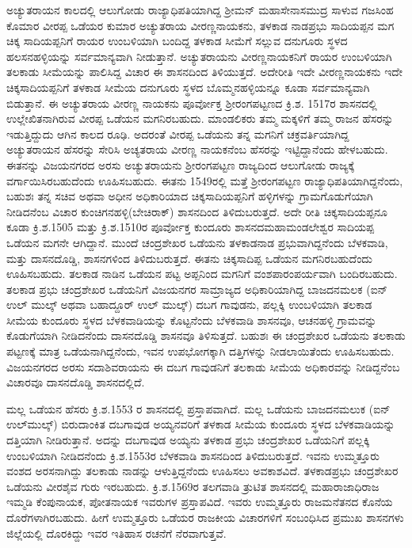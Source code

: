 ಅಚ್ಯುತರಾಯನ ಕಾಲದಲ್ಲಿ ಆಲುಗೋಡು ರಾಜ್ಯಾಧಿಪತಿಯಾಗಿದ್ದ ಶ‍್ರೀಮನ್​ ಮಹಾಸೇನಾಸಮುದ್ರ ಸಾಳುವ ಗಜಸಿಂಹ ಕೊಮಾರ ವೀರಪ್ಪ ಒಡೆಯರ ಕುಮಾರ ಅಚ್ಯುತರಾಯ ವೀರಣ್ಣನಾಯಕನು, ತಳಕಾಡ ನಾಡಪ್ರಭು ಸಾದಿಯಪ್ಪನ ಮಗ ಚಿಕ್ಕ ಸಾದಿಯಪ್ಪನಿಗೆ ರಾಯರ ಉಂಬಳಿಯಾಗಿ ಬಂದಿದ್ದ ತಳಕಾಡ ಸೀಮೆಗೆ ಸಲ್ಲುವ ದನುಗೂರು ಸ್ಥಳದ ಹಲಸನಹಳ್ಳಿಯನ್ನು ಸರ್ವಮಾನ್ಯವಾಗಿ ನೀಡುತ್ತಾನೆ. ಅಚ್ಯುತರಾಯನು ವೀರಣ್ಣನಾಯಕನಿಗೆ ರಾಯರ ಉಂಬಳಿಯಾಗಿ ತಲಕಾಡು ಸೀಮೆಯನ್ನು ಪಾಲಿಸಿದ್ದ ವಿಚಾರ ಈ ಶಾಸನದಿಂದ ತಿಳಿಯುತ್ತದೆ. ಅದೇರೀತಿ ಇದೇ ವೀರಣ್ಣನಾಯಕನು ಇದೇ ಚಿಕ್ಕಸಾದಿಯಪ್ಪನಿಗೆ ತಳಕಾಡ ಸೀಮೆಯ ದನುಗೂರು ಸ್ಥಳದ ಬೊಮ್ಮನಹಳ್ಳಿಯನ್ನೂ ಕೂಡಾ ಸರ್ವಮಾನ್ಯವಾಗಿ ಬಿಡುತ್ತಾನೆ. ಈ ಅಚ್ಯುತರಾಯ ವೀರಣ್ಣ ನಾಯಕನು ಪೂರ್ವೋಕ್ತ ಶ‍್ರೀರಂಗಪಟ್ಟಣದ ಕ್ರಿ.ಶ. 1517ರ ಶಾಸನದಲ್ಲಿ ಉಲ್ಲೇಖಿತನಾಗಿರುವ ವೀರಪ್ಪ ಒಡೆಯನ ಮಗನಿರಬಹುದು. ಮಾಂಡಲಿಕರು ತಮ್ಮ ಮಕ್ಕಳಿಗೆ ತಮ್ಮ ರಾಜನ ಹೆಸರನ್ನು ಇಡುತ್ತಿದ್ದುದು ಆಗಿನ ಕಾಲದ ರೂಢಿ. ಅದರಂತೆ ವೀರಪ್ಪ ಒಡೆಯನು ತನ್ನ ಮಗನಿಗೆ ಚಕ್ರವರ್ತಿಯಾಗಿದ್ದ ಅಚ್ಯುತರಾಯನ ಹೆಸರನ್ನು ಸೇರಿಸಿ ಅಚ್ಯತರಾಯ ವೀರಣ್ಣ ನಾಯಕನೆಂಬ ಹೆಸರನ್ನು ಇಟ್ಟಿದ್ದಾನೆಂದು ಹೇಳಬಹುದು. ಈತನನ್ನು ವಿಜಯನಗರದ ಅರಸು ಅಚ್ಯುತರಾಯನು ಶ‍್ರೀರಂಗಪಟ್ಟಣ ರಾಜ್ಯದಿಂದ ಆಲುಗೋಡು ರಾಜ್ಯಕ್ಕೆ ವರ್ಗಾಯಿಸಿರಬಹುದೆಂದು ಊಹಿಸಬಹುದು. ಈತನು 1549ರಲ್ಲಿ ಮತ್ತೆ ಶ‍್ರೀರಂಗಪಟ್ಟಣ ರಾಜ್ಯಾಧಿಪತಿಯಾಗಿದ್ದನೆಂದು, ಬಹುಶಃ ತನ್ನ ಸಚಿವ ಅಥವಾ ಅಧೀನ ಅಧಿಕಾರಿಯಾದ ಚಿಕ್ಕಸಾದಿಯಪ್ಪ\-ನಿಗೆ ಹಳ್ಳಿಗಳನ್ನು ಗ್ರಾಮಗೊಡುಗೆಯಾಗಿ ನೀಡಿದನೆಂಬ ವಿಚಾರ ಕುಂಚಿಗನಹಳ್ಳಿ(ಬೇಚಿರಾಕ್​) ಶಾಸನದಿಂದ ತಿಳಿದುಬರುತ್ತದೆ. ಅದೇ ರೀತಿ ಚಿಕ್ಕಸಾದಿಯಪ್ಪನೂ ಕೂಡಾ ಕ್ರಿ.ಶ.1505 ಮತ್ತು ಕ್ರಿ.ಶ.1510ರ ಪೂರ್ವೋಕ್ತ ಕುಂದೂರು ಶಾಸನದ\break ಮಹಾಮಂಡಲೇಶ್ವರ ಸಾದಿಯಪ್ಪ ಒಡೆಯನ ಮಗನೇ ಆಗಿದ್ದಾನೆ. ಮುಂದೆ ಚಂದ್ರಶೇಖರ ಒಡೆಯನು ತಳಕಾಡನಾಡ ಪ್ರಭುವಾಗಿದ್ದನೆಂದು ಬೆಳಕವಾಡಿ, ಮತ್ತು ದಾಸನದೊಡ್ಡಿ, ಶಾಸನಗಳಿಂದ ತಿಳಿದುಬರುತ್ತದೆ. ಈತನು ಚಿಕ್ಕಸಾದಿಪ್ಪ ಒಡೆಯನ ಮಗನಿರಬಹುದೆಂದು ಊಹಿಸಬಹುದು. ತಲಕಾಡ ನಾಡಿನ ಒಡೆಯನ ಪಟ್ಟ ಅಪ್ಪನಿಂದ ಮಗನಿಗೆ ವಂಶ\-ಪಾರಂಪರ್ಯವಾಗಿ ಬಂದಿರಬಹುದು. ತಲಕಾಡ ಪ್ರಭು ಚಂದ್ರಶೇಖರ ಒಡೆಯನಿಗೆ ವಿಜಯನಗರ ಸಾಮ್ರಾಜ್ಯದ ಅಧಿಕಾರಿಯಾಗಿದ್ದ ಬಾಜದನಮಲಕ (ಐನ್​ ಉಲ್​ ಮುಲ್ಕ್​ ಅಥವಾ ಬಹಾದ್ದೂರ್ ಉಲ್​ ಮುಲ್ಕ್​) ದಬಗ ಗಾವುಡನು, ಪಲ್ಲಕ್ಕಿ ಉಂಬಳಿಯಾಗಿ ತಲಕಾಡ ಸೀಮೆಯ ಕುಂದೂರು ಸ್ಥಳದ ಬೆಳಕವಾಡಿಯನ್ನು ಕೊಟ್ಟನೆಂದು ಬೆಳಕವಾಡಿ ಶಾಸನವೂ, ಆಚನಹಳ್ಳಿ ಗ್ರಾಮವನ್ನು ಕೊಡುಗೆಯಾಗಿ ನೀಡಿದನೆಂದು ದಾಸನದೊಡ್ಡಿ ಶಾಸನವೂ ತಿಳಿಸುತ್ತದೆ. ಬಹುಶಃ ಈ ಚಂದ್ರಶೇಖರ ಒಡೆಯನು ತಲಕಾಡು ಪಟ್ಟಣಕ್ಕೆ ಮಾತ್ರ ಒಡೆಯನಾಗಿದ್ದನೆಂದು, ಇವನ ಉಪಭೋಗಕ್ಕಾಗಿ ದತ್ತಿಗಳನ್ನು ನೀಡಲಾಯಿತೆಂದು ಊಹಿಸಬಹುದು. ವಿಜಯನಗರದ ಅರಸು ಸದಾಶಿವರಾಯನು ಈ ದಬಗ ಗಾವುಡನಿಗೆ ತಲಕಾಡು ಸೀಮೆಯ ಅಧಿಕಾರವನ್ನು ನೀಡಿದ್ದನೆಂಬ ವಿಚಾರವೂ ದಾಸನದೊಡ್ಡಿ ಶಾಸನದಲ್ಲಿದೆ.

ಮಲ್ಲ ಒಡೆಯನ ಹೆಸರು ಕ್ರಿ.ಶ.1553 ರ ಶಾಸನದಲ್ಲಿ ಪ್ರಸ್ತಾಪವಾಗಿದೆ. ಮಲ್ಲ ಒಡೆಯನು ಬಾಜದನಮಲುಕ (ಐನ್​\enginline{-}ಉಲ್​\enginline{-}ಮುಲ್ಕ್​) ಬಿರುದಾಂಕಿತ ದಬಗಾವುಡ ಅಯ್ಯನವರಿಗೆ ತಳಕಾಡ ಸೀಮೆಯ ಕುಂದೂರು ಸ್ಥಳದ ಬೆಳಕವಾಡಿಯನ್ನು ದತ್ತಿಯಾಗಿ ನೀಡಿರುತ್ತಾನೆ. ಅದನ್ನು ದಬಗಾವುಡ ಅಯ್ಯನು ತಳಕಾಡ ಪ್ರಭು ಚಂದ್ರಶೇಖರ ಒಡೆಯನಿಗೆ ಪಲ್ಲಕ್ಕಿ ಉಂಬಳಿಯಾಗಿ ನೀಡಿದನೆಂದು ಕ್ರಿ.ಶ.1553ರ ಬೆಳಕವಾಡಿ ಶಾಸನದಿಂದ ತಿಳಿದುಬರುತ್ತದೆ. ಇವನು ಉಮ್ಮತ್ತೂರು ವಂಶದ ಅರಸನಾಗಿದ್ದು ತಲಕಾಡು ನಾಡನ್ನು ಆಳುತ್ತಿದ್ದನೆಂದು ಊಹಿಸಲು ಅವಕಾಶವಿದೆ. ತಳಕಾಡಪ್ರಭು ಚಂದ್ರಶೇಖರ ಒಡೆಯನು ವೀರಶೈವ ಗುರು ಇರಬಹುದು. ಕ್ರಿ.ಶ.1569ರ ತಲಗವಾಡಿ ತ್ರುಟಿತ ಶಾಸನದಲ್ಲಿ ಮಹಾರಾಜಾಧಿರಾಜ ಇಮ್ಮಡಿ ಕೆಂಪುನಾಯಕ, ಪೋತನಾಯಕ ಇವರುಗಳ ಪ್ರಸ್ತಾಪವಿದೆ. ಇವರು ಉಮ್ಮತ್ತೂರು ರಾಜಮನೆತನದ ಕೊನೆಯ ದೊರೆಗಳಾಗಿರಬಹುದು. ಹೀಗೆ ಉಮ್ಮತ್ತೂರು ಒಡೆಯರ ರಾಜಕೀಯ ವಿಚಾರಗಳಿಗೆ ಸಂಬಂಧಿಸಿದ ಪ್ರಮುಖ ಶಾಸನಗಳು ಜಿಲ್ಲೆಯಲ್ಲಿ ದೊರಕಿದ್ದು ಇವರ ಇತಿಹಾಸ ರಚನೆಗೆ ನೆರವಾಗುತ್ತವೆ.


